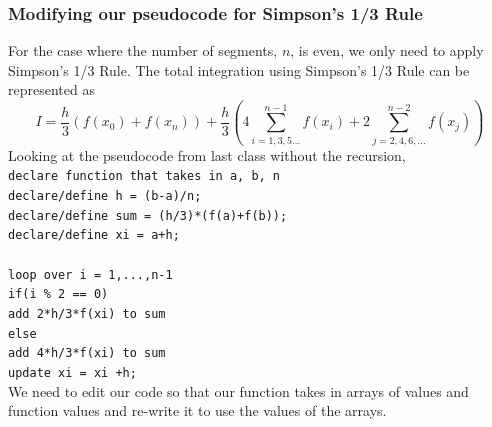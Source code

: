 \documentclass{if-beamer}
\begin{document}
\begin{frame}
	\frametitle{Modifying our pseudocode for Simpson's 1/3 Rule}
	For the case where the number of segments, $n$, is even, we only need to apply Simpson's 1/3 Rule. The total integration using Simpson's 1/3 Rule can be represented as
	$$I = \frac{h}{3}(f(x_0)+f(x_n))+\frac{h}{3}\left( 4\sum_{i = 1,3,5...}^{n-1}f(x_i) + 2\sum_{j = 2,4,6,...}^{n-2} f(x_j) \right)$$
	Looking at the pseudocode from last class without the recursion, \\\vspace{5pt}
	\texttt{declare function that takes in a, b, n}\\
	\texttt{declare/define h = (b-a)/n;}\\
	\texttt{declare/define sum = (h/3)*(f(a)+f(b)); }\\
	\texttt{declare/define xi = a+h;}\\
	\texttt{ }\\
	\texttt{loop over i = 1,...,n-1 }\\
	\texttt{\qquad if(i \% 2 == 0)}\\
	\texttt{\qquad \qquad add 2*h/3*f(xi) to sum} \\
	\texttt{\qquad else}\\
	\texttt{\qquad \qquad add 4*h/3*f(xi) to sum} \\
	\texttt{\qquad update xi = xi +h;}\\\vspace{3pt}
	We need to edit our code so that our function takes in arrays of  values and function values and re-write it to use the values of the arrays.  
\end{frame}
\end{document}
